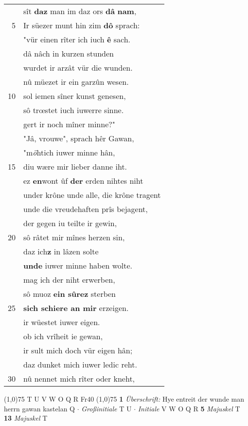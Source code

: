 \documentclass[8pt,a4paper,notitlepage]{article}
\begin{document}
\begin{table}[ht]
\begin{minipage}[t]{0.5\linewidth}
\begin{tabular}{rl}
 & sît \textbf{daz} man im daz ors \textbf{dâ} \textbf{nam},\\ 
5 & Ir süezer munt hin zim \textbf{dô} sprach:\\ 
 & "vür einen rîter ich iuch \textbf{ê} sach.\\ 
 & dâ nâch in kurzen stunden\\ 
 & wurdet ir arzât vür die wunden.\\ 
 & nû müezet ir ein garzûn wesen.\\ 
10 & sol iemen sîner kunst genesen,\\ 
 & sô trœstet iuch iuwerre sinne.\\ 
 & gert ir noch mîner minne?"\\ 
 & "Jâ, vrouwe", sprach hêr Gawan,\\ 
 & "m\textit{ö}htich iuwer minne hân,\\ 
15 & diu wære mir lieber danne iht.\\ 
 & ez \textbf{en}wont ûf \textbf{der} erden nihtes niht\\ 
 & under krône unde alle, die krône tragent\\ 
 & unde die vreudehaften prîs bejagent,\\ 
 & der gegen iu teilte ir gewin,\\ 
20 & sô râtet mir mînes herzen sin,\\ 
 & daz ich\textbf{z} in lâzen solte\\ 
 & \textbf{unde} iuwer minne haben wolte.\\ 
 & mag ich der niht erwerben,\\ 
 & sô muoz \textbf{ein sûrez} sterben\\ 
25 & \textbf{sich schiere an mir} erzeigen.\\ 
 & ir wüestet iuwer eigen.\\ 
 & ob ich vrîheit ie gewan,\\ 
 & ir sult mich doch vür eigen hân;\\ 
 & daz dunket mich iuwer ledic reht.\\ 
30 & nû nennet mich rîter oder kneht,\\ 
\end{tabular}
\scriptsize
\line(1,0){75} \newline
T U V W O Q R Fr40 \newline
\line(1,0){75} \newline
\textbf{1} \textit{Überschrift:} Hye entreit der wunde man herrn gawan kastelan Q   $\cdot$ \textit{Großinitiale} T U   $\cdot$ \textit{Initiale} V W O Q R  \textbf{5} \textit{Majuskel} T  \textbf{13} \textit{Majuskel} T  \newline

\end{minipage}
\end{table}
\end{document}
